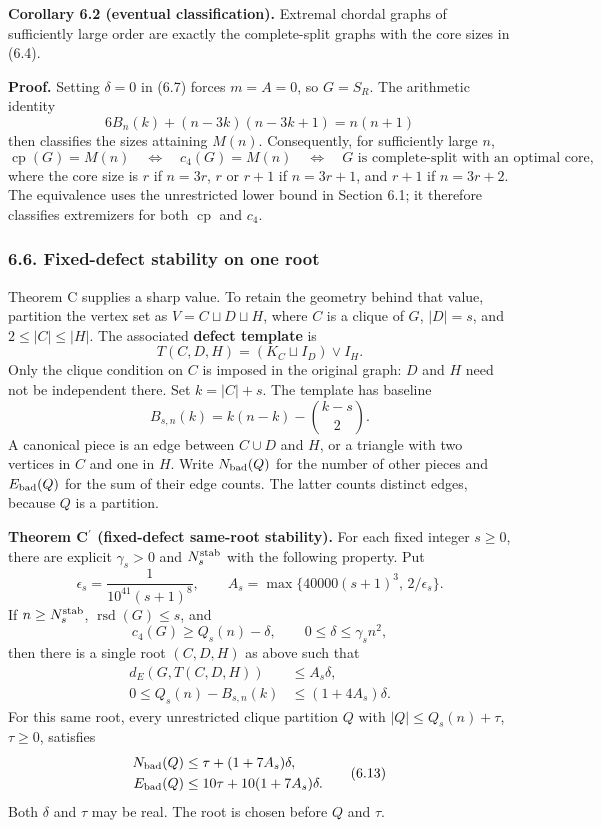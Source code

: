 \documentclass[english,11pt,a4paper]{article}
\begin{document}

\textbf{Corollary 6.2 (eventual classification).} Extremal chordal graphs of sufficiently large order are exactly the complete-split graphs with the core sizes in (6.4).

\textbf{Proof.} Setting \(\delta=0\) in (6.7) forces \(m=A=0\), so \(G=S_R\). The arithmetic identity \[
6B_n(k)+(n-3k)(n-3k+1)=n(n+1)
\tag{6.8}
\] then classifies the sizes attaining \(M(n)\). Consequently, for sufficiently large \(n\), \[
\operatorname{cp}(G)=M(n)
\quad\Longleftrightarrow\quad
c_4(G)=M(n)
\quad\Longleftrightarrow\quad
G\text{ is complete-split with an optimal core},
\tag{6.9}
\] where the core size is \(r\) if \(n=3r\), \(r\) or \(r+1\) if \(n=3r+1\), and \(r+1\) if \(n=3r+2\). The equivalence uses the unrestricted lower bound in Section 6.1; it therefore classifies extremizers for both \(\operatorname{cp}\) and \(c_4\).

\subsubsection{6.6. Fixed-defect stability on one root}\label{fixed-defect-stability-on-one-root}

Theorem C supplies a sharp value. To retain the geometry behind that value, partition the vertex set as \(V=C\sqcup D\sqcup H\), where \(C\) is a clique of \(G\), \(|D|=s\), and \(2\le |C|\le |H|\). The associated \textbf{defect template} is \[
T(C,D,H)=(K_C\sqcup I_D)\vee I_H.
\] Only the clique condition on \(C\) is imposed in the original graph: \(D\) and \(H\) need not be independent there. Set \(k=|C|+s\). The template has baseline \[
B_{s,n}(k)=k(n-k)-\binom{k-s}{2}.
\tag{6.10}
\] A canonical piece is an edge between \(C\cup D\) and \(H\), or a triangle with two vertices in \(C\) and one in \(H\). Write \(N_{\rm bad}(Q)\) for the number of other pieces and \(E_{\rm bad}(Q)\) for the sum of their edge counts. The latter counts distinct edges, because \(Q\) is a partition.

\textbf{Theorem \texorpdfstring{C\ensuremath{^{\prime}}}{C'} (fixed-defect same-root stability).} For each fixed integer \(s\ge0\), there are explicit \(\gamma_s>0\) and \(N_s^{\rm stab}\) with the following property. Put \[
\epsilon_s=\frac1{10^{41}(s+1)^8},\qquad
A_s=\max\{40000(s+1)^3,\,2/\epsilon_s\}.
\tag{6.11}
\] If \(n\ge N_s^{\rm stab}\), \(\operatorname{rsd}(G)\le s\), and \[
c_4(G)\ge Q_s(n)-\delta,\qquad 0\le\delta\le\gamma_s n^2,
\] then there is a single root \((C,D,H)\) as above such that \[
\begin{aligned}
d_E(G,T(C,D,H))&\le A_s\delta,\\
0\le Q_s(n)-B_{s,n}(k)&\le(1+4A_s)\delta.
\end{aligned}
\tag{6.12}
\] For this same root, every unrestricted clique partition \(Q\) with \(|Q|\le Q_s(n)+\tau\), \(\tau\ge0\), satisfies \[
\begin{aligned}
N_{\rm bad}(Q)&\le\tau+(1+7A_s)\delta,\\
E_{\rm bad}(Q)&\le10\tau+10(1+7A_s)\delta.
\end{aligned}
\tag{6.13}
\] Both \(\delta\) and \(\tau\) may be real. The root is chosen before \(Q\) and \(\tau\).
\end{document}
